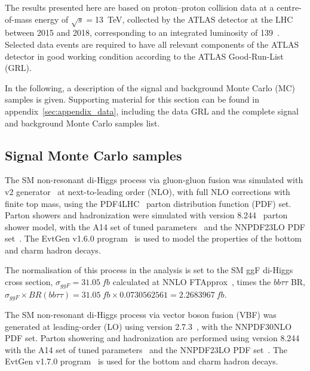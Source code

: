 The results presented here are based on proton–proton collision data at a centre-of-mass energy of $\sqrt{s}=$13~TeV, collected by the ATLAS detector at the LHC between 2015 and 2018, corresponding to an integrated luminosity of 139~\ifb. Selected data events are required to have all relevant components of the ATLAS detector in good working condition according to the ATLAS Good-Run-List (GRL).

In the following, a description of the signal and background Monte Carlo (MC) samples is given. Supporting material for this section can be found in appendix~\ref{sec:appendix_data}, including the data GRL and the complete signal and background Monte Carlo samples list.

\subsection{Signal Monte Carlo samples}


The SM non-resonant di-Higgs process via gluon-gluon fusion was simulated with \POWHEGBOX v2 generator~\cite{Powheg1, Powheg2, Powheg3} at next-to-leading order (NLO), with full NLO corrections with finite top mass, using the PDF4LHC~\cite{Butterworth:2015oua} parton distribution function (PDF) set. Parton showers and hadronization were simulated with  version 8.244~\cite{PYTHIA82} parton shower model, with the A14 set of tuned parameters~\cite{A14tune, ATLAS:2012uec} and the NNPDF23LO PDF set~\cite{NNPDF23PDFSet}. The EvtGen v1.6.0 program~\cite{EvtGen} is used to model the properties of the bottom and charm hadron decays.

The normalisation of this process in the analysis is set to the SM ggF di-Higgs cross section, $\sigma_{ggF}=\SI{31.05}{fb}$ calculated at NNLO FTApprox~\cite{Grazzini:2018bsd}, times the $bb\tau\tau$ BR, $\sigma_{ggF} \times BR (bb \tau\tau)  = \SI{31.05}{fb} \times 0.0730562561  =  \SI{2.2683967}{fb}$.  

The SM non-resonant di-Higgs process via vector boson fusion (VBF) was generated at leading-order (LO) using \MADGRAPH version 2.7.3~\cite{mg5_lo}, with the NNPDF30NLO~\cite{NNPDF} PDF set. Parton showering and hadronization are performed using  version 8.244~\cite{PYTHIA82} with the A14 set of tuned parameters~\cite{A14tune, ATLAS:2012uec} and the NNPDF23LO PDF set~\cite{NNPDF23PDFSet}. The EvtGen  v1.7.0 program~\cite{EvtGen} is used for the bottom and charm hadron decays.

